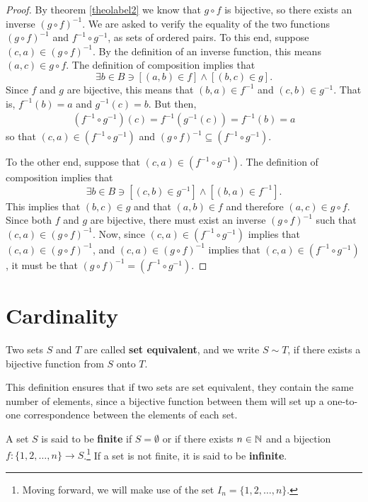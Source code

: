 \begin{proof}
	By theorem \ref{theolabel2} we know that $g\circ f$ is bijective, so there exists an inverse $(g\circ f)^{-1}$. We are asked to verify the equality of the two functions $(g\circ f)^{-1}$ and $f^{-1}\circ g^{-1}$, as sets of ordered pairs. To this end, suppose $(c,a)\in (g\circ f)^{-1}$. By the definition of an inverse function, this means $(a,c)\in g\circ f$. The definition of composition implies that
	$$\exists b\in B \ni [(a,b)\in f]\land [(b,c)\in g].$$
	Since $f$ and $g$ are bijective, this means that $(b,a)\in f^{-1}$ and $(c,b)\in g^{-1}$. That is, $f^{-1}(b)=a$ and $g^{-1}(c)=b$. But then,
	\begin{align}
		(f^{-1}\circ g^{-1})(c)=f^{-1}(g^{-1}(c))=f^{-1}(b)=a
	\end{align}
	so that $(c,a)\in (f^{-1}\circ g^{-1})$ and $(g\circ f)^{-1}\subseteq (f^{-1}\circ g^{-1})$.
	
	To the other end, suppose that $(c,a)\in (f^{-1}\circ g^{-1})$. The definition of composition implies that 
	$$\exists b\in B \ni [(c,b)\in g^{-1}]\land [(b,a)\in f^{-1}].$$
	This implies that $(b,c)\in g$ and that $(a,b)\in f$ and therefore $(a,c)\in g\circ f$. Since both $f$ and $g$ are bijective, there must exist an inverse $(g\circ f)^{-1}$ such that $(c,a)\in (g\circ f)^{-1}$. Now, since $(c,a)\in (f^{-1}\circ g^{-1})$ implies that $(c,a)\in (g\circ f)^{-1}$, and $(c,a)\in (g\circ f)^{-1}$ implies that $(c,a)\in (f^{-1}\circ g^{-1})$, it must be that $(g\circ f)^{-1} = (f^{-1}\circ g^{-1})$.
\end{proof}

\newpage
\section{Cardinality}

\begin{definition}
	Two sets $S$ and $T$ are called \textbf{set equivalent}, and we write $S\sim T$, if there exists a bijective function from $S$ onto $T$.
\end{definition}

This definition ensures that if two sets are set equivalent, they contain the same number of elements, since a bijective function between them will set up a one-to-one correspondence between the elements of each set.

\begin{definition}
	A set $S$ is said to be \textbf{finite} if $S=\emptyset$ or if there exists $n\in \mathbb{N}$ and a bijection $f:\{1,2,\hdots,n\}\rightarrow S$.\footnote{Moving forward, we will make use of the set $I_n=\{1,2,\hdots,n\}$.} If a set is not finite, it is said to be \textbf{infinite}.
\end{definition}


